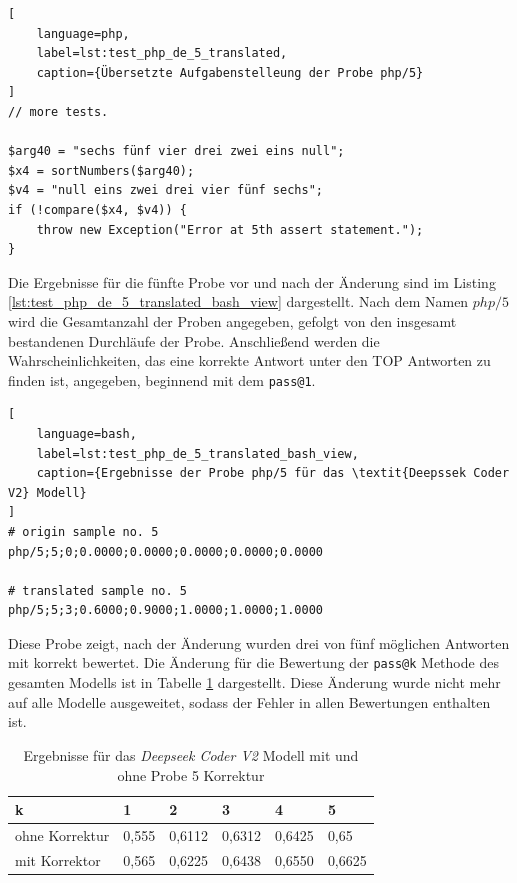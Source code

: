 \begin{lstlisting}[
	language=php,
	label=lst:test_php_de_5_translated,
	caption={Übersetzte Aufgabenstelleung der Probe php/5}
]
// more tests.

$arg40 = "sechs fünf vier drei zwei eins null";
$x4 = sortNumbers($arg40);
$v4 = "null eins zwei drei vier fünf sechs";
if (!compare($x4, $v4)) {
    throw new Exception("Error at 5th assert statement.");
}
\end{lstlisting}

Die Ergebnisse für die fünfte Probe vor und nach der Änderung sind im Listing \ref{lst:test_php_de_5_translated_bash_view} dargestellt. Nach dem Namen $php/5$ wird die Gesamtanzahl der Proben angegeben, gefolgt von den insgesamt bestandenen Durchläufe der Probe. Anschließend werden die Wahrscheinlichkeiten, das eine korrekte Antwort unter den TOP Antworten zu finden ist, angegeben, beginnend mit dem \texttt{pass@1}.\vspace{0.2cm}

\begin{lstlisting}[
	language=bash,
	label=lst:test_php_de_5_translated_bash_view,
	caption={Ergebnisse der Probe php/5 für das \textit{Deepssek Coder V2} Modell}
]
# origin sample no. 5
php/5;5;0;0.0000;0.0000;0.0000;0.0000;0.0000

# translated sample no. 5
php/5;5;3;0.6000;0.9000;1.0000;1.0000;1.0000
\end{lstlisting}

Diese Probe zeigt, nach der Änderung wurden drei von fünf möglichen Antworten mit korrekt bewertet. Die Änderung für die Bewertung der \texttt{pass@k} Methode des gesamten Modells ist in Tabelle \ref{tab:pass_at_k_results_bevor_after_translate} dargestellt. Diese Änderung wurde nicht mehr auf alle Modelle ausgeweitet, sodass der Fehler in allen Bewertungen enthalten ist.\vspace{0.2cm}

\begin{table}
	\begin{tabular}{|l|lllll|}
		\hline
		k & 1 & 2 & 3 & 4 & 5 \\
		\hline
		ohne Korrektur & 0,555 & 0,6112 & 0,6312 & 0,6425 & 0,65 \\
		mit Korrektor  & 0,565 & 0,6225 & 0,6438 & 0,6550 & 0,6625 \\
		\hline
		\hline
	\end{tabular}\centering
	\label{tab:pass_at_k_results_bevor_after_translate}
	\caption{Ergebnisse für das \textit{Deepseek Coder V2} Modell mit und ohne Probe 5 Korrektur }
\end{table}


